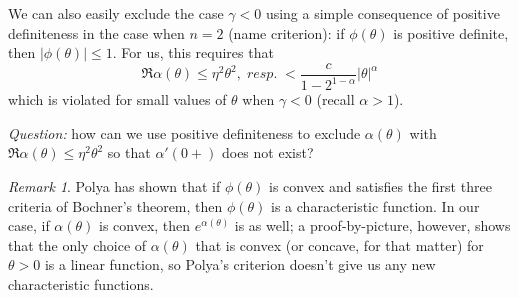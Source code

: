 \documentclass[11pt]{amsart}
\theoremstyle{remark}
\newtheorem{rem}{Remark}
\theoremstyle{definition}
\begin{document}
We can also easily exclude the case $\gamma < 0$ using a simple consequence of positive definiteness in the case when $n=2$ (name criterion): if $\phi(\theta)$ is positive definite, then $|\phi(\theta)| \leq 1$.  For us, this requires that 
\[
	\Re \alpha(\theta) \leq  \eta^{2} \theta^{2},\; resp. \; < \frac{c}{1-2^{1-\alpha}}|\theta|^{\alpha}
\]
which is violated for small values of $\theta$ when $\gamma < 0$ (recall $\alpha > 1$). 

\noindent\emph{Question:} how can we use positive definiteness to exclude $\alpha(\theta)$ with $\Re \alpha(\theta) \leq  \eta^{2} \theta^{2}$ so that $\alpha'(0+)$ does not exist?

\begin{rem}
Polya has shown that if $\phi(\theta)$ is convex and satisfies the first three criteria of Bochner's theorem, then $\phi(\theta)$ is a characteristic function.  In our case, if $\alpha(\theta)$ is convex, then $e^{\alpha(\theta)}$ is as well; a proof-by-picture, however, shows that the only choice of $\alpha(\theta)$ that is convex (or concave, for that matter) for $\theta > 0$ is a linear function, so Polya's criterion doesn't give us any new characteristic functions.
\end{rem}
 




%
\end{document}
